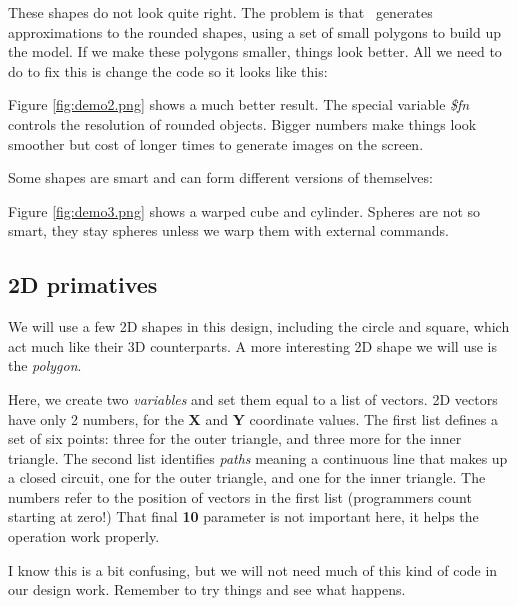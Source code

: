 These shapes do not look quite right. The problem is that \osc\  generates
approximations to the rounded shapes, using a set of small polygons to build up
the model. If we make these polygons smaller, things look better. All we need
to do to fix this is change the code so it looks like this:


Figure \ref{fig:demo2.png} shows a much better result. The special variable
{\it \$fn} controls the resolution of rounded objects. Bigger numbers make
things look smoother but cost of longer times to generate images on the screen.



Some shapes are smart and can form different versions of themselves:


Figure \ref{fig:demo3.png} shows a warped cube and cylinder. Spheres are not so
smart, they stay spheres unless we warp them with external commands.



\subsection{2D primatives}

We will use a few 2D shapes in this design, including the circle and square,
which act much like their 3D counterparts. A more interesting 2D shape we will
use is the {\it polygon}.


Here, we create two {\it variables} and set them equal to a list of vectors. 2D
vectors have only 2 numbers, for the {\bf X} and {\bf Y} coordinate values. The
first list defines a set of six points: three for the outer triangle, and three
more for the inner triangle. The second list identifies {\it paths} meaning a
continuous line that makes up a closed circuit, one for the outer triangle, and
one for the inner triangle. The numbers refer to the position of vectors in the
first list (programmers count starting at zero!) That final {\bf 10} parameter
is not important here, it helps the operation work properly.

I know this is a bit confusing, but we will not need much of this kind of code
in our design work. Remember to try things and see what happens.


